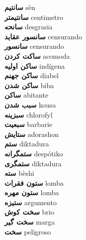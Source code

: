 \textbf{ سانتیم  } sèn \\
\textbf{ سانتیمتر  } centimetro \\
\textbf{ سانحه  } desgrasia \\
\textbf{ سانسور عقاید  } censurando \\
\textbf{ سانسور  } censurando \\
\textbf{ ساکت کردن  } acomoda \\
\textbf{ ساکن اولیه  } indígena \\
\textbf{ ساکن جهنم  } diabel \\
\textbf{ ساکن شدن  } biba \\
\textbf{ ساکن  } abitante \\
\textbf{ سبب شدن  } kousa \\
\textbf{ سبزینه  } chlorofyl \\
\textbf{ سبعیت  } barbarie \\
\textbf{ ستایش  } adorashon \\
\textbf{ ستم  } diktadura \\
\textbf{ ستمگرانه  } despótiko \\
\textbf{ ستمگری  } diktadura \\
\textbf{ سته  } bèshi \\
\textbf{ ستون فقرات  } lomba \\
\textbf{ ستون مهره  } lomba \\
\textbf{ ستیزه  } argumento \\
\textbf{ سخت کوش  } brio \\
\textbf{ سخت گیر  } marga \\
\textbf{ سخت  } peligroso \\
